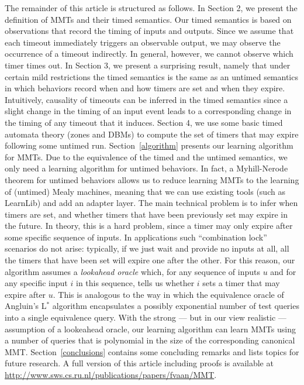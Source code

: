 The remainder of this article is structured as follows.
In Section 2, we present the definition of MMTs and their timed semantics.
Our timed semantics is based on observations that record the timing of inputs and outputs. 
Since we assume that each timeout immediately triggers an observable output, we may observe
the occurrence of a timeout indirectly. In general, however, we cannot observe which timer times out.
In Section 3, we present a surprising result, namely that under certain mild restrictions the timed semantics
is the same as an untimed semantics in which behaviors record when and how timers are set and when they expire.
Intuitively, causality of timeouts can be inferred in the timed semantics since a slight change in the timing of an input event leads to a corresponding change in the timing of any timeout that it induces.
\iflong
Section 4, we use some basic timed automata theory (zones and DBMs) to compute the set of timers that may expire  following some untimed run.
\fi
Section~\ref{algorithm} presents our learning algorithm for MMTs. 
Due to the equivalence of the timed and the untimed semantics, we only need a learning algorithm for untimed behaviors.
In fact, a Myhill-Nerode theorem for untimed behaviors allows us to reduce learning MMTs
to the learning of (untimed) Mealy machines, meaning that we can use existing tools (such as LearnLib) and add an adapter layer.
The main technical problem is to infer when timers are set, and whether timers that have been previously set may expire
in the future.
In theory, this is a hard problem, since a timer may only expire after some specific sequence of inputs.
In applications such ``combination lock'' scenarios do not arise: typically, if we just wait and provide no inputs at all,
all the timers that have been set will expire one after the other.
For this reason, our algorithm assumes a \emph{lookahead oracle} which, for any sequence of inputs $u$ and for any specific input
$i$ in this sequence, tells us whether $i$ sets a timer that may expire after $u$.
This is analogous to the way in which the equivalence oracle 
of Angluin's L$^{\ast}$ algorithm \cite{Ang87} encapsulates a possibly exponential number of test queries into
a single equivalence query.
With the strong --- but in our view realistic --- assumption of a lookeahead oracle, our learning algorithm can learn MMTs
using a number of queries that is polynomial in the size of the corresponding canonical MMT.
Section~\ref{conclusions} contains some concluding remarks and lists topics for future research.
\iflong
%
\else
A full version of this article including proofs is available at \url{http://www.sws.cs.ru.nl/publications/papers/fvaan/MMT}.
\fi

